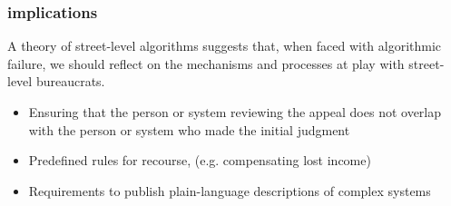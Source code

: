 \documentclass[presentation]{subfiles}
\begin{document}



\begin{frame}[t]\frametitle{implications}


  A theory of street-level algorithms suggests that, when faced with algorithmic failure, we should reflect on the mechanisms and processes at play with street-level bureaucrats.

\begin{itemize}
  \item Ensuring that the person or system reviewing the appeal does not overlap with the person or system who made the initial judgment
  \item Predefined rules for recourse, (e.g. compensating lost income)
  \item Requirements to publish plain-language descriptions of complex systems
\end{itemize}

\end{frame}
\end{document}
